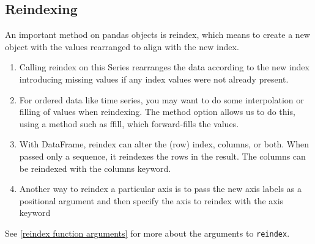 \subsection{Reindexing}
An important method on pandas objects is reindex, which means to create a new object with the values rearranged to align with the new index.

\begin{enumerate}
    \item Calling reindex on this Series rearranges the data according to the new index introducing missing values if any index values were not already present.
    \item For ordered data like time series, you may want to do some interpolation or filling of values when reindexing. The method option allows us to do this, using a method such as ffill, which forward-fills the values.
    \item With DataFrame, reindex can alter the (row) index, columns, or both. When passed only a sequence, it reindexes the rows in the result. The columns can be reindexed with the columns keyword.
    \item Another way to reindex a particular axis is to pass the new axis labels as a positional argument and then specify the axis to reindex with the axis keyword
\end{enumerate}

See \autoref{reindex function arguments} for more about the arguments to \verb|reindex|.

